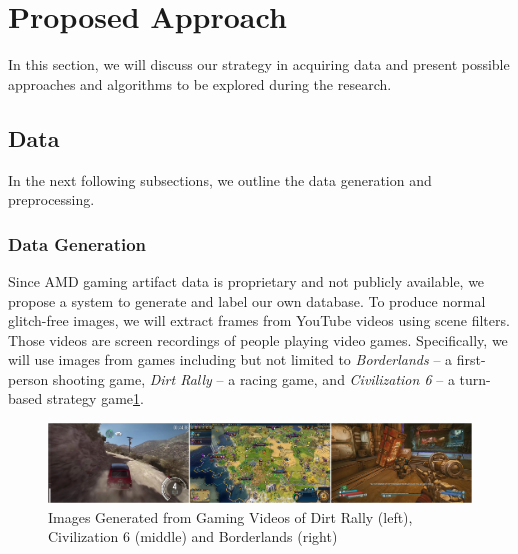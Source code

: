 \documentclass[12pt]{article}
\begin{document}
\section{Proposed Approach}

In this section, we will discuss our strategy in acquiring data and present possible approaches and algorithms to be explored during the research.

\subsection{Data}
In the next following subsections, we outline the data generation and preprocessing. 

\subsubsection{Data Generation}
Since AMD gaming artifact data is proprietary and not publicly available, we propose a system to generate and label our own database. To produce normal glitch-free images, we will extract frames from YouTube videos using scene filters. Those videos are screen recordings of people playing video games. Specifically, we will use images from games including but not limited to \textit{Borderlands} -- a first-person shooting game, \textit{Dirt Rally} -- a racing game, and \textit{Civilization 6} -- a turn-based strategy game\ref{fig:games_data}. 

\begin{figure}[!ht]
\centering
\includegraphics[scale=0.08]{gameimage.jpg}
\caption{Images Generated from Gaming Videos of Dirt Rally (left), Civilization 6 (middle) and Borderlands (right)}
\label{fig:games_data}
\end{figure}

\end{document}
